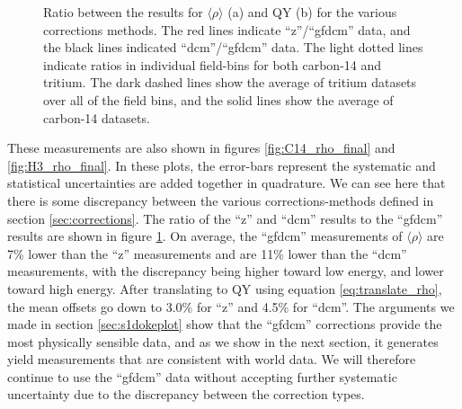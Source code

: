 \begin{figure}[!h]
\begin{subfigure}{0.5\linewidth}
\caption{}
\end{subfigure}
\caption{Ratio between the results for $\langle \rho \rangle$ (a) and QY (b) for the various corrections methods. The red lines indicate ``z''/``gfdcm'' data, and the black lines indicated ``dcm''/``gfdcm'' data. The light dotted lines indicate ratios in individual field-bins for both carbon-14 and tritium. The dark dashed lines show the average of tritium datasets over all of the field bins, and the solid lines show the average of carbon-14 datasets. }
\label{fig:rho_ratio}
\end{figure}

These measurements are also shown in figures \ref{fig:C14_rho_final} and \ref{fig:H3_rho_final}. In these plots, the error-bars represent the systematic and statistical uncertainties are added together in quadrature. We can see here that there is some discrepancy between the various corrections-methods defined in section \ref{sec:corrections}. The ratio of the ``z'' and ``dcm'' results to the ``gfdcm'' results are shown in figure \ref{fig:rho_ratio}. On average, the ``gfdcm'' measurements of $\langle \rho \rangle$ are 7\% lower than the ``z'' measurements and are 11\% lower than the ``dcm'' measurements, with the discrepancy being higher toward low energy, and lower toward high energy. After translating to QY using equation \ref{eq:translate_rho}, the mean offsets go down to 3.0\% for ``z'' and 4.5\% for ``dcm''. The arguments we made in section \ref{sec:s1dokeplot} show that the ``gfdcm'' corrections provide the most physically sensible data, and as we show in the next section, it generates yield measurements that are consistent with world data. We will therefore continue to use the ``gfdcm'' data without accepting further systematic uncertainty due to the discrepancy between the correction types. 


